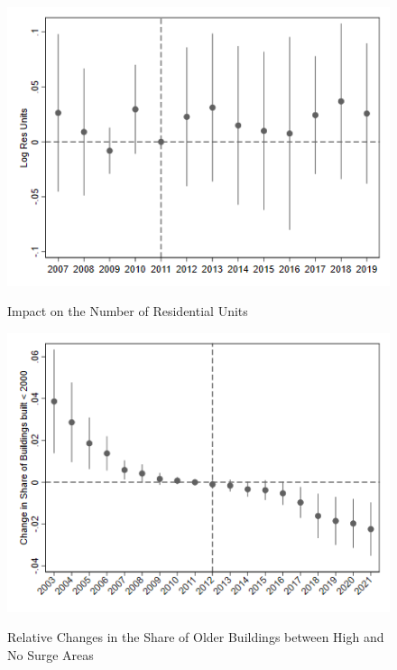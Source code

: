 \documentclass[12pt]{article}
\begin{document}
{{{{{{{{{\begin{figure}[h!]
\begin{center}
\caption{Impact on the Number of Residential Units}
\includegraphics[scale = 0.65]{New Construction/R12 Residential Units.png}
\label{fig:resunits}
\end{center}
\end{figure}

\begin{figure}[h!]
\begin{center}
\caption{Relative Changes in the Share of Older Buildings between High and No Surge Areas}
\includegraphics[scale = 0.65]{Composition/R17 Share of Older Buildings.png}
\label{fig:pre2000}
\end{center}
\end{figure}


}}}}}}}}}
\end{document}
